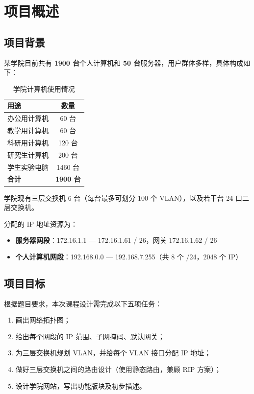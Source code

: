 \documentclass[12pt,a4paper]{ctexart}
\begin{document}
\section{项目概述}

\subsection{项目背景}

某学院目前共有 \textbf{1900 台}个人计算机和 \textbf{50 台}服务器，用户群体多样，具体构成如下：

\begin{table}[H]
\centering
\caption{学院计算机使用情况}
\begin{tabular}{lc}
\toprule
\textbf{用途} & \textbf{数量} \\
\midrule
办公用计算机 & 60 台 \\
教学用计算机 & 60 台 \\
科研用计算机 & 120 台 \\
研究生计算机 & 200 台 \\
学生实验电脑 & 1460 台 \\
\midrule
\textbf{合计} & \textbf{1900 台} \\
\bottomrule
\end{tabular}
\end{table}

学院现有三层交换机 6 台（每台最多可划分 100 个 VLAN），以及若干台 24 口二层交换机。

分配的 IP 地址资源为：

\begin{itemize}
  \item \textbf{服务器网段}：172.16.1.1 --- 172.16.1.61 / 26，网关 172.16.1.62 / 26
  \item \textbf{个人计算机网段}：192.168.0.0 --- 192.168.7.255（共 8 个 /24，2048 个 IP）
\end{itemize}

\subsection{项目目标}

根据题目要求，本次课程设计需完成以下五项任务：

\begin{enumerate}
  \item 画出网络拓扑图；
  \item 给出每个网段的 IP 范围、子网掩码、默认网关；
  \item 为三层交换机规划 VLAN，并给每个 VLAN 接口分配 IP 地址；
  \item 做好三层交换机之间的路由设计（使用静态路由，兼顾 RIP 方案）；
  \item 设计学院网站，写出功能版块及初步描述。
\end{enumerate}
\end{document}

